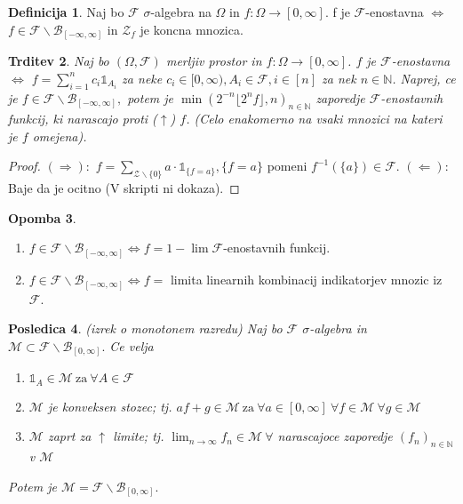 \documentclass[a4paper,12pt]{article}
\theoremstyle{definition} %
\newtheorem{definicija}{Definicija}[section]
\newtheorem{opomba}[definicija]{Opomba}
\theoremstyle{plain} %
\newtheorem{trditev}[definicija]{Trditev}
\newtheorem{posledica}[definicija]{Posledica}
\newcommand{\N}{\mathbb{N}}
\newcommand{\F}{\mathcal{F}}
\begin{document}
            \begin{definicija}
                Naj bo $\F$ $\sigma$-algebra na $\Omega$ in $f:\Omega\rightarrow [0, \infty]$.
                f je $\F$-enostavna $\iff$ $f \in \F\backslash\mathcal{B}_{[-\infty, \infty]}$ in $\mathcal{Z}_f$ je koncna mnozica.
            \end{definicija}

            \begin{trditev}
                Naj bo $(\Omega, \F)$ merljiv prostor in $f:\Omega\rightarrow [0, \infty]$. $f$ je $\F$-enostavna $\iff$
                $f = \sum_{i = 1}^{n}c_i\mathds{1}_{A_i}$ za neke $c_i \in [0, \infty), A_i \in \F, i \in [n]$ za nek $n \in \N$. Naprej, ce je $f \in \F\backslash\mathcal{B}_{[-\infty, \infty]},$
                potem je $\min\left(2^{-n}\lfloor2^nf\rfloor, n\right)_{n \in \N}$ zaporedje $\F$-enostavnih funkcij, ki narascajo proti ($\uparrow$) $f$. (Celo enakomerno na vsaki mnozici na kateri je $f$ omejena).
            \end{trditev}

            \begin{proof}
                $(\Rightarrow):$ $f = \sum_{\mathcal{Z}\backslash\{0\}}a\cdot\mathds{1}_{\{f = a\}}, \{f = a\}$ pomeni $f^{-1}(\{a\}) \in \F.$
                $(\Leftarrow):$ Baje da je ocitno (V skripti ni dokaza).
            \end{proof}

            \begin{opomba}
                \begin{enumerate}
                    \item $f \in \F\backslash\mathcal{B}_{[-\infty, \infty]} \iff f = 1 - \lim\F$-enostavnih funkcij.
                    \item $f \in \F\backslash\mathcal{B}_{[-\infty, \infty]} \iff f =$ limita linearnih kombinacij indikatorjev mnozic iz $\F$.
                \end{enumerate}

            \end{opomba}

            \begin{posledica}(izrek o monotonem razredu)
                Naj bo $\F$ $\sigma$-algebra in $\mathcal{M} \subset \F\backslash\mathcal{B}_{[0, \infty]}.$ Ce velja
                \begin{enumerate}
                    \item $\mathds{1}_A \in \mathcal{M} \ \text{za} \ \forall A \in \F$
                    \item $\mathcal{M}$ je konveksen stozec; tj. $af + g \in \mathcal{M} \ \text{za} \ \forall a \in [0, \infty] \ \forall f \in \mathcal{M} \ \forall g \in \mathcal{M}$
                    \item $\mathcal{M}$ zaprt za $\uparrow$ limite; tj. $\lim_{n \rightarrow \infty}f_n \in \mathcal{M} \ \forall$ narascajoce zaporedje $(f_n)_{n \in \N} $ v $\mathcal{M}$
                \end{enumerate}
                Potem je $\mathcal{M} =  \F\backslash\mathcal{B}_{[0, \infty]}.$
            \end{posledica}
\end{document}

